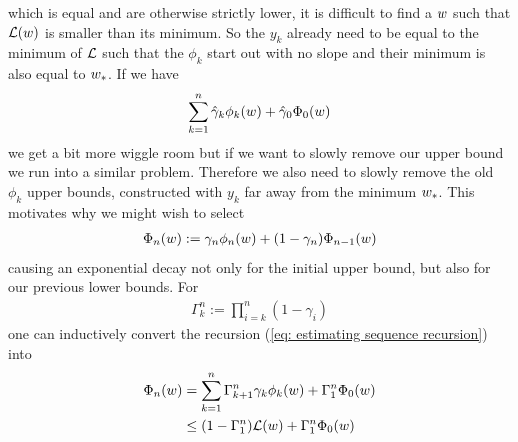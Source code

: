 which is equal and are otherwise strictly lower, it is difficult to find
a \(w\) such that \(\mathcal{L}(w)\) is smaller than its minimum.
So the \(y_k\) already need to be equal to the minimum
of \(\mathcal{L}\) such that the \(\phi_k\) start out with no slope and their
minimum is also equal to \(w_*\). If we have
\begin{align*}
	\sum_{k=1}^n \hat{\gamma}_k \phi_k(w)
	+ \hat{\gamma}_0 \Phi_0(w)
\end{align*}
we get a bit more wiggle room but if we want to slowly remove our upper bound
we run into a similar problem. Therefore we also need to slowly remove the old
\(\phi_k\) upper bounds, constructed with \(y_k\) far away from the minimum
\(w_*\). This motivates why we might wish to select
\begin{align}\label{eq: estimating sequence recursion}
	\Phi_n(w) := \gamma_n \phi_n(w) + (1-\gamma_n)\Phi_{n-1}(w)
\end{align}
causing an exponential decay not only for the initial upper bound, but also for
our previous lower bounds. For
\begin{align*}
	\Gamma_k^n := \prod_{i=k}^n (1-\gamma_i)
\end{align*}
one can inductively convert the recursion (\ref{eq: estimating sequence
recursion}) into
\begin{align}
	\nonumber
	\Phi_n(w)
	&= \sum_{k=1}^n \Gamma_{k+1}^n\gamma_k \phi_k(w)
	+ \Gamma_1^n\Phi_0(w) \\
	\label{eq: estimating sequence explicit}
	&\le (1-\Gamma_1^n)\mathcal{L}(w) + \Gamma_1^n\Phi_0(w)
\end{align}


